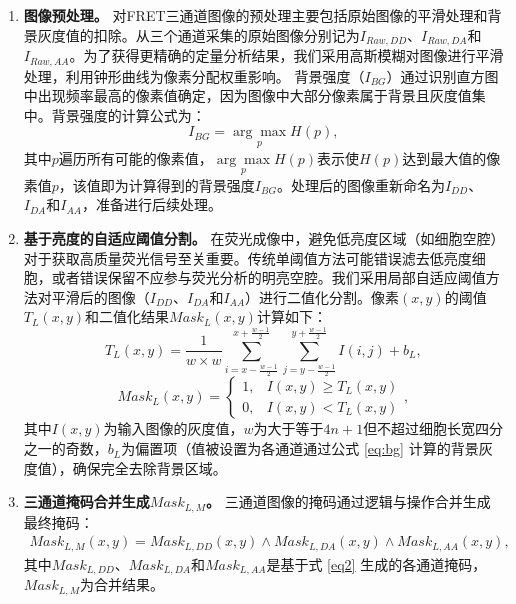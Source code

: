 \begin{enumerate}
\item \textbf{图像预处理。}  
对FRET三通道图像的预处理主要包括原始图像的平滑处理和背景灰度值的扣除。从三个通道采集的原始图像分别记为$I_{Raw,DD}$、$I_{Raw,DA}$和$I_{Raw,AA}$。为了获得更精确的定量分析结果，我们采用高斯模糊对图像进行平滑处理，利用钟形曲线为像素分配权重影响。  
背景强度（$I_{BG}$）通过识别直方图中出现频率最高的像素值确定，因为图像中大部分像素属于背景且灰度值集中。背景强度的计算公式为：
\begin{equation}
    I_{BG} = \underset{p}{\arg\max} H(p), 
    \label{eq:bg}
\end{equation}
其中$p$遍历所有可能的像素值，$\underset{p}{\arg\max} H(p)$表示使$H(p)$达到最大值的像素值$p$，该值即为计算得到的背景强度$I_{BG}$。处理后的图像重新命名为$I_{DD}$、$I_{DA}$和$I_{AA}$，准备进行后续处理。

\item \textbf{基于亮度的自适应阈值分割。}  
在荧光成像中，避免低亮度区域（如细胞空腔）对于获取高质量荧光信号至关重要。传统单阈值方法可能错误滤去低亮度细胞，或者错误保留不应参与荧光分析的明亮空腔。我们采用局部自适应阈值方法对平滑后的图像（$I_{DD}$、$I_{DA}$和$I_{AA}$）进行二值化分割。像素$(x, y)$的阈值$T_L(x,y)$和二值化结果${Mask}_L(x,y)$计算如下：
\begin{equation}
    T_L(x,y)=\frac{1}{w \times w} \sum_{i=x-\frac{w-1}{2}}^{x+\frac{w-1}{2}} \sum_{j=y-\frac{w-1}{2}}^{y+\frac{w-1}{2}} I(i,j)+b_L,
    \label{eq1}
\end{equation}
\begin{equation}
    {Mask}_L(x,y)=\begin{cases}
        1,&I(x,y) \geq T_L(x,y) \\
        0,&I(x,y) < T_L(x,y)
    \end{cases},
    \label{eq2}
\end{equation}
其中$I(x,y)$为输入图像的灰度值，$w$为大于等于$4n+1$但不超过细胞长宽四分之一的奇数，$b_L$为偏置项（值被设置为各通道通过公式 \ref{eq:bg} 计算的背景灰度值），确保完全去除背景区域。

\item \textbf{三通道掩码合并生成${Mask}_{L, M}$。}  
三通道图像的掩码通过逻辑与操作合并生成最终掩码：
\begin{equation}
    \begin{split}
    {Mask}_{L, M}(x,y)={Mask}_{L, DD}(x,y) \land {Mask}_{L, DA}(x,y) \land {Mask}_{L, AA}(x,y),
    \end{split}
    \label{eq3}
\end{equation}
其中${Mask}_{L, DD}$、${Mask}_{L, DA}$和${Mask}_{L, AA}$是基于式 \ref{eq2} 生成的各通道掩码，${Mask}_{L, M}$为合并结果。


\end{enumerate}
